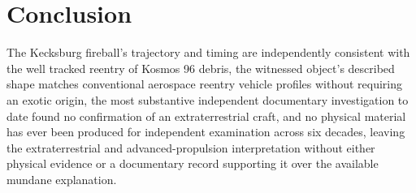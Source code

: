 \documentclass[11pt]{article}
\begin{document}
\section{Conclusion}

The Kecksburg fireball's trajectory and timing are independently consistent with the well tracked reentry of Kosmos 96 debris, the witnessed object's described shape matches conventional aerospace reentry vehicle profiles without requiring an exotic origin, the most substantive independent documentary investigation to date found no confirmation of an extraterrestrial craft, and no physical material has ever been produced for independent examination across six decades, leaving the extraterrestrial and advanced-propulsion interpretation without either physical evidence or a documentary record supporting it over the available mundane explanation.
\end{document}
